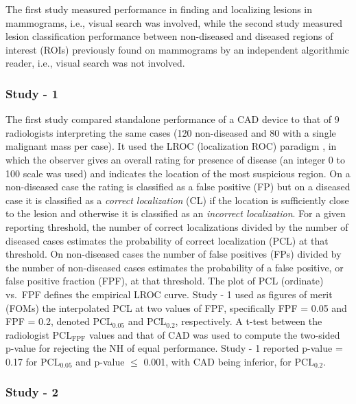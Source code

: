 \documentclass[
]{book}
\begin{document}
The first study \citep{hupse2013standalone} measured performance in finding and localizing lesions in mammograms, i.e., visual search was involved, while the second study \citep{kooi2016comparison} measured lesion classification performance between non-diseased and diseased regions of interest (ROIs) previously found on mammograms by an independent algorithmic reader, i.e., visual search was not involved.

\hypertarget{standalone-cad-radiologists-study1}{%
\subsubsection{Study - 1}\label{standalone-cad-radiologists-study1}}

The first study \citep{hupse2013standalone} compared standalone performance of a CAD device to that of 9 radiologists interpreting the same cases (120 non-diseased and 80 with a single malignant mass per case). It used the LROC (localization ROC) paradigm \citep{starr1975visual, metz1976observer, swensson1996unified}, in which the observer gives an overall rating for presence of disease (an integer 0 to 100 scale was used) and indicates the location of the most suspicious region. On a non-diseased case the rating is classified as a false positive (FP) but on a diseased case it is classified as a \emph{correct localization} (CL) if the location is sufficiently close to the lesion and otherwise it is classified as an \emph{incorrect localization}. For a given reporting threshold, the number of correct localizations divided by the number of diseased cases estimates the probability of correct localization (PCL) at that threshold. On non-diseased cases the number of false positives (FPs) divided by the number of non-diseased cases estimates the probability of a false positive, or false positive fraction (FPF), at that threshold. The plot of PCL (ordinate) vs.~FPF defines the empirical LROC curve. Study - 1 used as figures of merit (FOMs) the interpolated PCL at two values of FPF, specifically FPF = 0.05 and FPF = 0.2, denoted \(\text{PCL}_{0.05}\) and \(\text{PCL}_{0.2}\), respectively. A t-test between the radiologist \(\text{PCL}_{\text{FPF}}\) values and that of CAD was used to compute the two-sided p-value for rejecting the NH of equal performance. Study - 1 reported p-value = 0.17 for \(\text{PCL}_{0.05}\) and p-value \(\leq\) 0.001, with CAD being inferior, for \(\text{PCL}_{0.2}\).

\hypertarget{standalone-cad-radiologists-study2}{%
\subsubsection{Study - 2}\label{standalone-cad-radiologists-study2}}
\end{document}
